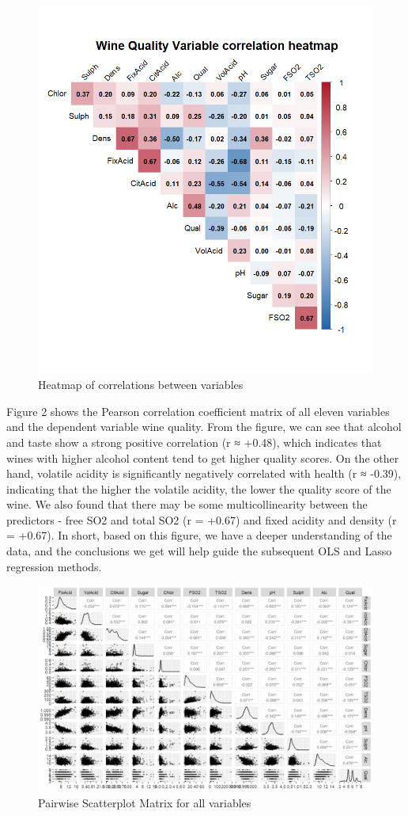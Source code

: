 \documentclass[
  doc,floatsintext]{apa6}
\begin{document}
\begin{figure}[H]

{\centering \includegraphics[width=0.5\linewidth]{../plots/r1} 

}

\caption{Heatmap of correlations between variables}\label{fig:heat}
\end{figure}

Figure 2 shows the Pearson correlation coefficient matrix of all eleven variables and the dependent variable wine quality. From the figure, we can see that alcohol and taste show a strong positive correlation (r ≈ +0.48), which indicates that wines with higher alcohol content tend to get higher quality scores. On the other hand, volatile acidity is significantly negatively correlated with health (r ≈ -0.39), indicating that the higher the volatile acidity, the lower the quality score of the wine. We also found that there may be some multicollinearity between the predictors - free SO2 and total SO2 (r = +0.67) and fixed acidity and density (r = +0.67). In short, based on this figure, we have a deeper understanding of the data, and the conclusions we get will help guide the subsequent OLS and Lasso regression methods.

\begin{figure}[H]

{\centering \includegraphics[width=0.5\linewidth]{../plots/p1} 

}

\caption{Pairwise Scatterplot Matrix for all variables}\label{fig:Pairwise}
\end{figure}
\end{document}
